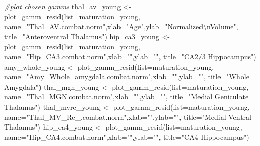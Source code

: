 \documentclass[
]{article}
\newenvironment{Shaded}{\begin{snugshade}}{\end{snugshade}}
\newcommand{\AttributeTok}[1]{\textcolor[rgb]{0.77,0.63,0.00}{#1}}
\newcommand{\CommentTok}[1]{\textcolor[rgb]{0.56,0.35,0.01}{\textit{#1}}}
\newcommand{\FunctionTok}[1]{\textcolor[rgb]{0.00,0.00,0.00}{#1}}
\newcommand{\NormalTok}[1]{#1}
\newcommand{\OtherTok}[1]{\textcolor[rgb]{0.56,0.35,0.01}{#1}}
\newcommand{\SpecialCharTok}[1]{\textcolor[rgb]{0.00,0.00,0.00}{#1}}
\newcommand{\StringTok}[1]{\textcolor[rgb]{0.31,0.60,0.02}{#1}}
\begin{document}
\begin{Shaded}
\begin{Highlighting}[]
\CommentTok{\#plot chosen gamms}
\NormalTok{thal\_av\_young }\OtherTok{\textless{}{-}} \FunctionTok{plot\_gamm\_resid}\NormalTok{(}\AttributeTok{list=}\NormalTok{maturation\_young, }\AttributeTok{name=}\StringTok{"Thal\_AV.combat.norm"}\NormalTok{,}\AttributeTok{xlab=}\StringTok{"Age"}\NormalTok{,}\AttributeTok{ylab=}\StringTok{"Normalized}\SpecialCharTok{\textbackslash{}n}\StringTok{Volume"}\NormalTok{, }\AttributeTok{title=}\StringTok{"Anteroventral Thalamus"}\NormalTok{)}
\NormalTok{hip\_ca3\_young }\OtherTok{\textless{}{-}} \FunctionTok{plot\_gamm\_resid}\NormalTok{(}\AttributeTok{list=}\NormalTok{maturation\_young, }\AttributeTok{name=}\StringTok{"Hip\_CA3.combat.norm"}\NormalTok{,}\AttributeTok{xlab=}\StringTok{""}\NormalTok{,}\AttributeTok{ylab=}\StringTok{""}\NormalTok{, }\AttributeTok{title=}\StringTok{"CA2/3 Hippocampus"}\NormalTok{)}
\NormalTok{amy\_whole\_young }\OtherTok{\textless{}{-}} \FunctionTok{plot\_gamm\_resid}\NormalTok{(}\AttributeTok{list=}\NormalTok{maturation\_young, }\AttributeTok{name=}\StringTok{"Amy\_Whole\_amygdala.combat.norm"}\NormalTok{,}\AttributeTok{xlab=}\StringTok{""}\NormalTok{,}\AttributeTok{ylab=}\StringTok{""}\NormalTok{, }\AttributeTok{title=}\StringTok{"Whole Amygdala"}\NormalTok{)}
\NormalTok{thal\_mgn\_young }\OtherTok{\textless{}{-}} \FunctionTok{plot\_gamm\_resid}\NormalTok{(}\AttributeTok{list=}\NormalTok{maturation\_young, }\AttributeTok{name=}\StringTok{"Thal\_MGN.combat.norm"}\NormalTok{,}\AttributeTok{xlab=}\StringTok{""}\NormalTok{,}\AttributeTok{ylab=}\StringTok{""}\NormalTok{, }\AttributeTok{title=}\StringTok{"Medial Geniculate Thalamus"}\NormalTok{)}
\NormalTok{thal\_mvre\_young }\OtherTok{\textless{}{-}} \FunctionTok{plot\_gamm\_resid}\NormalTok{(}\AttributeTok{list=}\NormalTok{maturation\_young, }\AttributeTok{name=}\StringTok{"Thal\_MV\_Re\_.combat.norm"}\NormalTok{,}\AttributeTok{xlab=}\StringTok{""}\NormalTok{,}\AttributeTok{ylab=}\StringTok{""}\NormalTok{, }\AttributeTok{title=}\StringTok{"Medial Ventral Thalamus"}\NormalTok{)}
\NormalTok{hip\_ca4\_young }\OtherTok{\textless{}{-}} \FunctionTok{plot\_gamm\_resid}\NormalTok{(}\AttributeTok{list=}\NormalTok{maturation\_young, }\AttributeTok{name=}\StringTok{"Hip\_CA4.combat.norm"}\NormalTok{,}\AttributeTok{xlab=}\StringTok{""}\NormalTok{,}\AttributeTok{ylab=}\StringTok{""}\NormalTok{, }\AttributeTok{title=}\StringTok{"CA4 Hippocampus"}\NormalTok{)}


\end{Highlighting}
\end{Shaded}
\end{document}
